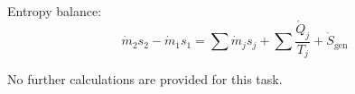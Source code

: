 Entropy balance:  
\[
\dot{m}_2 s_2 - \dot{m}_1 s_1 = \sum \dot{m}_j s_j + \sum \frac{\dot{Q}_j}{T_j} + \dot{S}_{\text{gen}}
\]  

No further calculations are provided for this task.